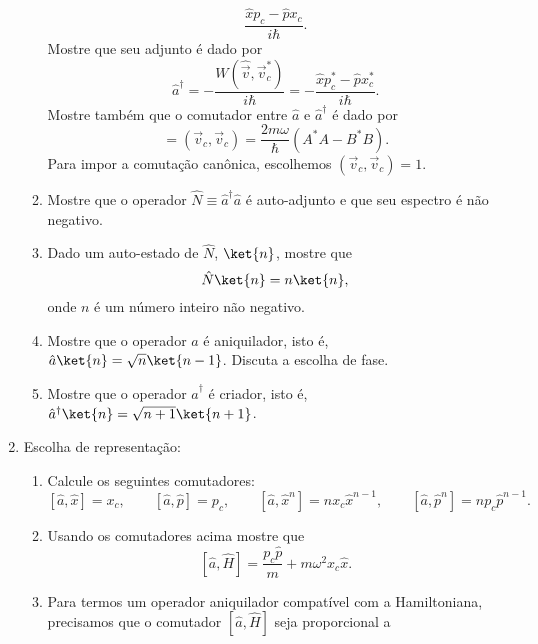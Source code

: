 \begin{enumerate}
\begin{enumerate}
$$                  \frac{\hat{x}p_c - \hat{p}x_c}{i\hbar}.$$
                Mostre que seu adjunto é dado por
                \begin{equation*}
                  \hat{a}^\dagger = -\frac{W(\hat{\vec{v}},\vec{v}_c^*)}{i\hbar} =
                  -\frac{\hat{x}p_c^* - \hat{p}x_c^*}{i\hbar}.
                \end{equation*}
                Mostre também que o comutador entre $\hat{a}$ e $\hat{a}^\dagger$ é dado por
                \begin{equation*}
                  [\hat{a}, \hat{a}^\dagger] =
                  \left(\vec{v}_c, \vec{v}_c\right) = \frac{2m\omega}{\hbar}\left(A^*A - B^*B\right).
                \end{equation*}
                Para impor a comutação canônica, escolhemos $\left(\vec{v}_c, \vec{v}_c\right)=1$.
          \item Mostre que o operador $\hat{N} \equiv \hat{a}^\dagger\hat{a}$ é
                auto-adjunto e que seu espectro é não negativo.
          \item Dado um auto-estado de $\hat{N}$, $\ket{n}$, mostre que
                \begin{equation*}
                  \hat{N}\ket{n} = n\ket{n},
                \end{equation*}
                onde $n$ é um número inteiro não negativo.
          \item Mostre que o operador $\hat{a}$ é aniquilador, isto é,
                $\hat{a}\ket{n} = \sqrt{n}\ket{n-1}$. Discuta a escolha de fase.
          \item Mostre que o operador $\hat{a}^\dagger$ é criador, isto é,
                $\hat{a}^\dagger\ket{n} = \sqrt{n+1}\ket{n+1}$.
        \end{enumerate}
  \item Escolha de representação:
        \begin{enumerate}
          \item Calcule os seguintes comutadores:
                $$[\hat{a}, \hat{x}] = x_c,\qquad [\hat{a}, \hat{p}] = p_c, \qquad
                  [\hat{a}, \hat{x}^n] = nx_c\hat{x}^{n-1}, \qquad [\hat{a}, \hat{p}^n] = np_c\hat{p}^{n-1}.$$
          \item Usando os comutadores acima mostre que
                $$[\hat{a},\hat{H}] = \frac{p_c\hat{p}}{m}+m\omega^2x_c\hat{x}.$$
          \item Para termos um operador aniquilador compatível com a Hamiltoniana,
                precisamos que o comutador $[\hat{a},\hat{H}]$ seja proporcional a

\end{enumerate}
\end{enumerate}
